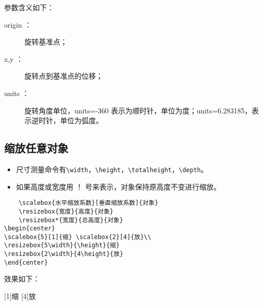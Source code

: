 参数含义如下：\\
\begin{description}
  \item[origin ：]旋转基准点；
  \item[x,y ：]旋转点到基准点的位移；
  \item[units ：] 旋转角度单位，units=-360 表示为顺时针，单位为度；units=6.283185，表示逆时针，单位为弧度。
\end{description}
\begin{center}
\end{center}

\subsection{缩放任意对象}
\begin{itemize}
  \item 尺寸测量命令有\verb$\width$，\verb$\height$，\verb$\totalheight$，\verb$\depth$。
  \item 如果高度或宽度用 ！ 号来表示，对象保持原高度不变进行缩放。
\end{itemize}


\begin{shaded}
  \begin{Verbatim}
    \scalebox{水平缩放系数}[垂直缩放系数]{对象}
    \resizebox{宽度}{高度}{对象}
    \resizebox*{宽度}{总高度}{对象}
\begin{center}
\scalebox{5}[1]{缩} \scalebox{2}[4]{放}\\
\resizebox{5\width}{\height}{缩}
\resizebox{2\width}{4\height}{放}
\end{center}
  \end{Verbatim}
\end{shaded}
效果如下：
\begin{shaded}
\begin{center}
 \scalebox{5}[1]{缩} \scalebox{2}[4]{放}\\
\end{center}
\end{shaded}

